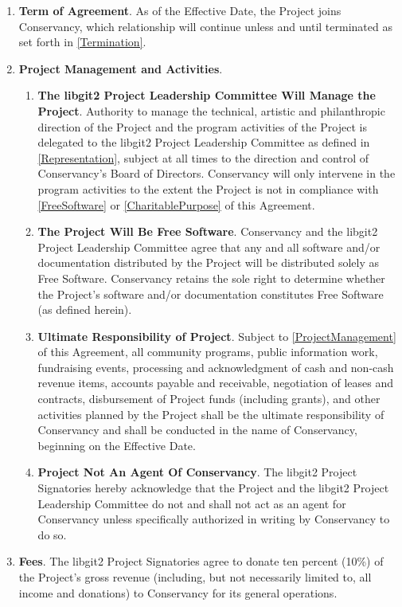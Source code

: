 \documentclass[letterpaper,12pt]{article}
\newcommand{\signatories}{libgit2 Project Signatories\xspace}
\newcommand{\leadershipbody}{libgit2 Project Leadership Committee\xspace}
\begin{document}
\begin{enumerate}[label=\arabic*.,ref=\S~\arabic*]
\item \textbf{Term of Agreement}. As of the Effective Date, the Project
joins Conservancy, which relationship will continue unless and until
terminated as set forth in \ref{Termination}. 
\item \textbf{Project Management and Activities}.


\begin{enumerate}[label=\alph*.,ref=\theenumi(\alph*)]
\item \textbf{The \leadershipbody Will Manage the Project}. \label{ProjectManagement}
Authority to manage the technical, artistic and philanthropic direction
of the Project and the program activities of the Project is delegated
to the \leadershipbody as defined in \ref{Representation},
subject at all times to the direction and control of Conservancy's
Board of Directors. Conservancy will only intervene in the program
activities to the extent the Project is not in compliance with \ref{FreeSoftware}
or \ref{CharitablePurpose} of this Agreement. 
\item \textbf{The Project Will Be Free Software}. \label{FreeSoftware}
Conservancy and the \leadershipbody agree that any and all software
and/or documentation distributed by the Project will be distributed solely as Free Software.
Conservancy retains the sole right to determine whether the Project's
software and/or documentation constitutes Free Software (as defined herein).
\item \textbf{Ultimate Responsibility of Project}. Subject to \ref{ProjectManagement}
of this Agreement, all community programs, public information work,
fundraising events, processing and acknowledgment of cash and non-cash
revenue items, accounts payable and receivable, negotiation of leases
and contracts, disbursement of Project funds (including grants), and
other activities planned by the Project shall be the ultimate responsibility
of Conservancy and shall be conducted in the name of Conservancy,
beginning on the Effective Date. 
\item \textbf{Project Not An Agent Of Conservancy}. The \signatories
hereby acknowledge that the Project and the \leadershipbody
do not and shall not act as an agent for Conservancy unless specifically
authorized in writing by Conservancy to do so. 
\end{enumerate}
\item \textbf{Fees}. The \signatories agree to donate ten percent
(10\%) of the Project's gross revenue (including, but not necessarily limited
to, all income and donations) to Conservancy for its general operations.



\end{enumerate}
\end{document}
